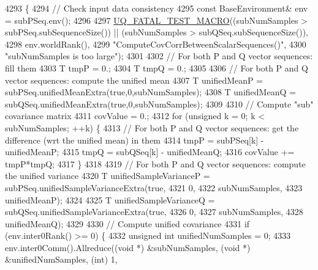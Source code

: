 \begin{DoxyCode}
4293 \{
4294   \textcolor{comment}{// Check input data consistency}
4295   \textcolor{keyword}{const} BaseEnvironment& env = subPSeq.env();
4296 
4297   \hyperlink{_defines_8h_a56d63d18d0a6d45757de47fcc06f574d}{UQ\_FATAL\_TEST\_MACRO}((subNumSamples > subPSeq.subSequenceSize()) || (subNumSamples > 
      subQSeq.subSequenceSize()),
4298                       env.worldRank(),
4299                       \textcolor{stringliteral}{"ComputeCovCorrBetweenScalarSequences()"},
4300                       \textcolor{stringliteral}{"subNumSamples is too large"});
4301 
4302   \textcolor{comment}{// For both P and Q vector sequences: fill them}
4303   T tmpP = 0.;
4304   T tmpQ = 0.;
4305 
4306   \textcolor{comment}{// For both P and Q vector sequences: compute the unified mean}
4307   T unifiedMeanP = subPSeq.unifiedMeanExtra(\textcolor{keyword}{true},0,subNumSamples);
4308   T unifiedMeanQ = subQSeq.unifiedMeanExtra(\textcolor{keyword}{true},0,subNumSamples);
4309 
4310   \textcolor{comment}{// Compute "sub" covariance matrix}
4311   covValue = 0.;
4312   \textcolor{keywordflow}{for} (\textcolor{keywordtype}{unsigned} k = 0; k < subNumSamples; ++k) \{
4313     \textcolor{comment}{// For both P and Q vector sequences: get the difference (wrt the unified mean) in them}
4314     tmpP = subPSeq[k] - unifiedMeanP;
4315     tmpQ = subQSeq[k] - unifiedMeanQ;
4316     covValue += tmpP*tmpQ;
4317   \}
4318 
4319   \textcolor{comment}{// For both P and Q vector sequences: compute the unified variance}
4320   T unifiedSampleVarianceP = subPSeq.unifiedSampleVarianceExtra(\textcolor{keyword}{true},
4321                                                                 0,
4322                                                                 subNumSamples,
4323                                                                 unifiedMeanP);
4324 
4325   T unifiedSampleVarianceQ = subQSeq.unifiedSampleVarianceExtra(\textcolor{keyword}{true},
4326                                                                 0,
4327                                                                 subNumSamples,
4328                                                                 unifiedMeanQ);
4329 
4330   \textcolor{comment}{// Compute unified covariance}
4331   \textcolor{keywordflow}{if} (env.inter0Rank() >= 0) \{
4332     \textcolor{keywordtype}{unsigned} \textcolor{keywordtype}{int} unifiedNumSamples = 0;
4333     env.inter0Comm().Allreduce((\textcolor{keywordtype}{void} *) &subNumSamples, (\textcolor{keywordtype}{void} *) &unifiedNumSamples, (\textcolor{keywordtype}{int}) 1, 

\end{DoxyCode}
